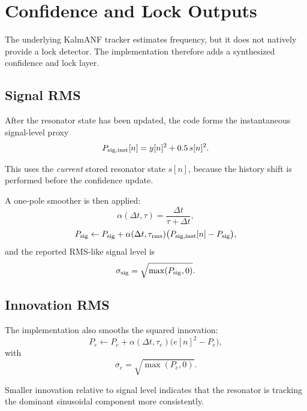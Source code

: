 \documentclass[conference]{IEEEtran}
\begin{document}
\section{Confidence and Lock Outputs}\label{sec:lock}

The underlying KalmANF tracker estimates frequency, but it does not natively
provide a lock detector. The implementation therefore adds a synthesized
confidence and lock layer.

\subsection{Signal RMS}

After the resonator state has been updated, the code forms the instantaneous
signal-level proxy
\begin{equation}
  P_{\rm sig,inst}[n] = y[n]^2 + 0.5\,s[n]^2.
\end{equation}

This uses the \emph{current} stored resonator state $s[n]$, because the
history shift is performed before the confidence update.

A one-pole smoother is then applied:
\begin{equation}
  \alpha(\Delta t,\tau) = \frac{\Delta t}{\tau+\Delta t},
\end{equation}
\begin{equation}
  P_{\rm sig} \leftarrow P_{\rm sig}
  + \alpha(\Delta t,\tau_{\rm rms})
    \bigl(P_{\rm sig,inst}[n]-P_{\rm sig}\bigr),
\end{equation}
and the reported RMS-like signal level is
\begin{equation}
  \sigma_{\rm sig} = \sqrt{\max(P_{\rm sig},0)}.
\end{equation}

\subsection{Innovation RMS}

The implementation also smooths the squared innovation:
\begin{equation}
  P_e \leftarrow P_e + \alpha(\Delta t,\tau_e)\bigl(e[n]^2 - P_e\bigr),
\end{equation}
with
\begin{equation}
  \sigma_e = \sqrt{\max(P_e,0)}.
\end{equation}

Smaller innovation relative to signal level indicates that the resonator is
tracking the dominant sinusoidal component more consistently.
\end{document}
